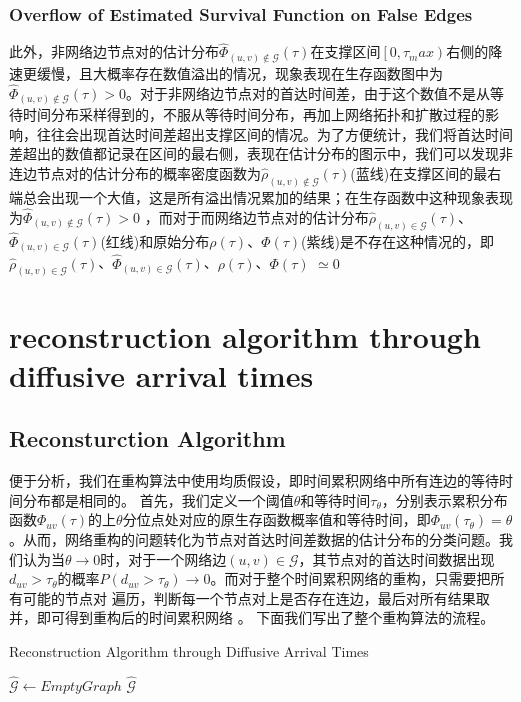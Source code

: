 \documentclass[journal]{IEEEtran}
\begin{document}
{		\subsubsection{Overflow of Estimated Survival Function on False Edges }
		此外，非网络边节点对的估计分布$\hat{\Phi}_{(u,v)\notin \mathcal{G}}(\tau)$在支撑区间$\left[0,\tau_max\right)$右侧的降速更缓慢，且大概率存在数值溢出的情况，现象表现在生存函数图中为$\hat{\Phi}_{(u,v)\notin \mathcal{G}}(\tau)>0$。对于非网络边节点对的首达时间差，由于这个数值不是从等待时间分布采样得到的，不服从等待时间分布，再加上网络拓扑和扩散过程的影响，往往会出现首达时间差超出支撑区间的情况。为了方便统计，我们将首达时间差超出的数值都记录在区间的最右侧，表现在估计分布的图示中，我们可以发现非连边节点对的估计分布的概率密度函数为$\hat{\rho}_{(u,v)\notin \mathcal{G}}(\tau)$(蓝线)在支撑区间的最右端总会出现一个大值，这是所有溢出情况累加的结果；在生存函数中这种现象表现为$\hat{\Phi}_{(u,v)\notin \mathcal{G}}(\tau)>0$ ，而对于而网络边节点对的估计分布$\hat{\rho}_{(u,v)\in \mathcal{G}}(\tau)$、$\hat{\Phi}_{(u,v)\in \mathcal{G}}(\tau)$(红线)和原始分布${\rho}(\tau)$、${\Phi}(\tau)$(紫线)是不存在这种情况的，即$\hat{\rho}_{(u,v)\in \mathcal{G}}(\tau)$、$\hat{\Phi}_{(u,v)\in \mathcal{G}}(\tau)$、${\rho}(\tau)$、${\Phi}(\tau)$ $\simeq 0$
		
	\section{reconstruction algorithm through diffusive arrival times}
	\subsection{Reconsturction Algorithm}
	便于分析，我们在重构算法中使用均质假设，即时间累积网络中所有连边的等待时间分布都是相同的。
	首先，我们定义一个阈值$\theta$和等待时间$\tau_\theta$，分别表示累积分布函数$\Phi_{uv}(\tau)$的上$\theta$分位点处对应的原生存函数概率值和等待时间，即$\Phi_{uv}(\tau_\theta)=\theta$ 。从而，网络重构的问题转化为节点对首达时间差数据的估计分布的分类问题。我们认为当$\theta\to 0$时，对于一个网络边$(u,v)\in \mathcal{G}$，其节点对的首达时间数据出现$d_{uv}>\tau_\theta$的概率$P(d_{uv}>\tau_\theta) \to 0$。而对于整个时间累积网络的重构，只需要把所有可能的节点对 遍历，判断每一个节点对上是否存在连边，最后对所有结果取并，即可得到重构后的时间累积网络 。
	下面我们写出了整个重构算法的流程。
		\begin{algorithm}
		\caption{Reconstruction Algorithm through Diffusive Arrival Times}
		\LinesNumbered  
		$\hat{\mathcal{G}} \gets Empty Graph $\;	
		\Return $\hat{\mathcal{G}}$\;
	\end{algorithm}	

}
\end{document}
